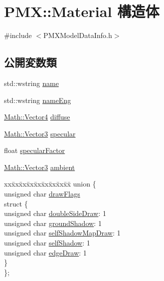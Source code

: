 \hypertarget{struct_p_m_x_1_1_material}{}\section{P\+MX\+:\+:Material 構造体}
\label{struct_p_m_x_1_1_material}


{\ttfamily \#include $<$P\+M\+X\+Model\+Data\+Info.\+h$>$}

\subsection*{公開変数類}
\begin{DoxyCompactItemize}
\item 
std\+::wstring \mbox{\hyperlink{struct_p_m_x_1_1_material_a95a1dfd00960dd80778caf5d2f3eddc0}{name}}
\item 
std\+::wstring \mbox{\hyperlink{struct_p_m_x_1_1_material_a2d9de596a0fa124e7b155c18cd775c2b}{name\+Eng}}
\item 
\mbox{\hyperlink{struct_math_1_1_vector4}{Math\+::\+Vector4}} \mbox{\hyperlink{struct_p_m_x_1_1_material_a089a21730222266130038d9fb2d98c9d}{diffuse}}
\item 
\mbox{\hyperlink{struct_math_1_1_vector3}{Math\+::\+Vector3}} \mbox{\hyperlink{struct_p_m_x_1_1_material_a7e3c35c7fe9da122bc451bd9fb480a9a}{specular}}
\item 
float \mbox{\hyperlink{struct_p_m_x_1_1_material_a32ca1ee309004a7e67ac78ffb5899fe1}{specular\+Factor}}
\item 
\mbox{\hyperlink{struct_math_1_1_vector3}{Math\+::\+Vector3}} \mbox{\hyperlink{struct_p_m_x_1_1_material_af0973e6d02e71ba78424601cce5d21ca}{ambient}}
\item 
\begin{tabbing}
xx\=xx\=xx\=xx\=xx\=xx\=xx\=xx\=xx\=\kill
union \{\\
\>unsigned char \mbox{\hyperlink{struct_p_m_x_1_1_material_a41a056f85d0e360682e7337d1a70bfeb}{drawFlags}}\\
\>struct \{\\
\>\>unsigned char \mbox{\hyperlink{struct_p_m_x_1_1_material_aaebe2e7507a126f16574611d62622d28}{doubleSideDraw}}: 1\\
\>\>unsigned char \mbox{\hyperlink{struct_p_m_x_1_1_material_a83ee6715ed692ed2639d2559d8575385}{groundShadow}}: 1\\
\>\>unsigned char \mbox{\hyperlink{struct_p_m_x_1_1_material_a677248cef605732b8e0ead2991b92a71}{selfShadowMapDraw}}: 1\\
\>\>unsigned char \mbox{\hyperlink{struct_p_m_x_1_1_material_abeed3521dc7f5b8a95a206ed18041779}{selfShadow}}: 1\\
\>\>unsigned char \mbox{\hyperlink{struct_p_m_x_1_1_material_a82b29e2b8e5e4ddcbd33ab841114976a}{edgeDraw}}: 1\\
\>\} \\
\}; \\


\end{tabbing}
\end{DoxyCompactItemize}
